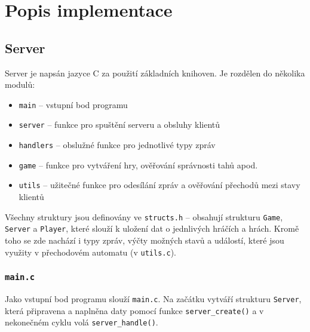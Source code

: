 \documentclass[11pt,a4paper]{article}
\begin{document}
\section{Popis implementace}

\subsection{Server}
Server je napsán jazyce C za použití základních knihoven. Je rozdělen do několika modulů:
\begin{itemize}
	\item \texttt{main} -- vstupní bod programu
	\item \texttt{server} -- funkce pro spuštění serveru a obsluhy klientů
	\item \texttt{handlers} -- obslužné funkce pro jednotlivé typy zpráv
	\item \texttt{game} -- funkce pro vytváření hry, ověřování správnosti tahů apod.
	\item \texttt{utils} -- užitečné funkce pro odesílání zpráv a ověřování přechodů mezi stavy klientů
\end{itemize}
Všechny struktury jsou definovány ve \texttt{structs.h} -- obsahují strukturu \texttt{Game}, \texttt{Server} a \texttt{Player}, které slouží k uložení dat o jednlivých hráčích a hrách. Kromě toho se zde nachází i typy zpráv, výčty možných stavů a událostí, které jsou využity v přechodovém automatu (v \texttt{utils.c}).

\subsubsection{\texttt{main.c}}
Jako vstupní bod programu slouží \texttt{main.c}. Na začátku vytváří strukturu \texttt{Server}, která připravena a naplněna daty pomocí funkce \texttt{server\_create()} a v nekonečném cyklu volá \texttt{server\_handle()}.
\end{document}
